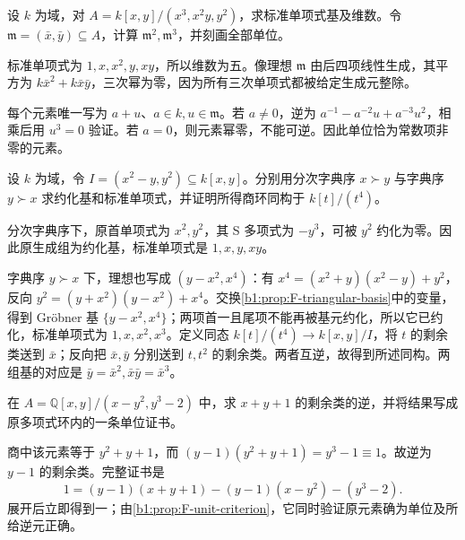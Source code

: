 \begin{exercise}\label{b1:ex:F-five-dimensional-quotient}
	设 \(k\) 为域，对 \(A=k[x,y]/(x^3,x^2y,y^2)\)，求标准单项式基及维数。令 \(\mathfrak m=(\bar x,\bar y)\subseteq A\)，计算 \(\mathfrak m^2,\mathfrak m^3\)，并刻画全部单位。
\end{exercise}
\begin{solution}
	标准单项式为 \(1,x,x^2,y,xy\)，所以维数为五。像理想 \(\mathfrak m\) 由后四项线性生成，其平方为 \(k\bar x^2+k\bar x\bar y\)，三次幂为零，因为所有三次单项式都被给定生成元整除。

	每个元素唯一写为 \(a+u\)、\(a\in k,u\in\mathfrak m\)。若 \(a\ne0\)，逆为 \(a^{-1}-a^{-2}u+a^{-3}u^2\)，相乘后用 \(u^3=0\) 验证。若 \(a=0\)，则元素幂零，不能可逆。因此单位恰为常数项非零的元素。
\end{solution}

\begin{exercise}\label{b1:ex:F-two-normal-bases}
	设 \(k\) 为域，令 \(I=(x^2-y,y^2)\subseteq k[x,y]\)。分别用分次字典序 \(x\succ y\) 与字典序 \(y\succ x\) 求约化基和标准单项式，并证明所得商环同构于 \(k[t]/(t^4)\)。
\end{exercise}
\begin{solution}
	分次字典序下，原首单项式为 \(x^2,y^2\)，其 S 多项式为 \(-y^3\)，可被 \(y^2\) 约化为零。因此原生成组为约化基，标准单项式是 \(1,x,y,xy\)。

	字典序 \(y\succ x\) 下，理想也写成 \((y-x^2,x^4)\)：有 \(x^4=(x^2+y)(x^2-y)+y^2\)，反向 \(y^2=(y+x^2)(y-x^2)+x^4\)。交换\cref{b1:prop:F-triangular-basis}中的变量，得到 Gröbner 基 \(\{y-x^2,x^4\}\)；两项首一且尾项不能再被基元约化，所以它已约化，标准单项式为 \(1,x,x^2,x^3\)。定义同态 \(k[t]/(t^4)\to k[x,y]/I\)，将 \(t\) 的剩余类送到 \(\bar x\)；反向把 \(\bar x,\bar y\) 分别送到 \(t,t^2\) 的剩余类。两者互逆，故得到所述同构。两组基的对应是 \(\bar y=\bar x^2,\bar x\bar y=\bar x^3\)。
\end{solution}

\begin{exercise}\label{b1:ex:F-inverse-certificate}
	在 \(A=\mathbb Q[x,y]/(x-y^2,y^3-2)\) 中，求 \(x+y+1\) 的剩余类的逆，并将结果写成原多项式环内的一条单位证书。
\end{exercise}
\begin{solution}
	商中该元素等于 \(y^2+y+1\)，而 \((y-1)(y^2+y+1)=y^3-1\equiv1\)。故逆为 \(y-1\) 的剩余类。完整证书是
	\[
		1=(y-1)(x+y+1)-(y-1)(x-y^2)-(y^3-2).
	\]
	展开后立即得到一；由\cref{b1:prop:F-unit-criterion}，它同时验证原元素确为单位及所给逆元正确。
\end{solution}

